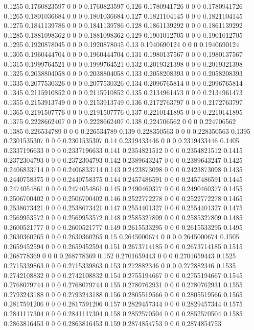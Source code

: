 {0.1255 0.1760823597 0 0 0 0.1760823597
0.126 0.1780941726 0 0 0 0.1780941726
0.1265 0.1801036684 0 0 0 0.1801036684
0.127 0.1821104145 0 0 0 0.1821104145
0.1275 0.1841139786 0 0 0 0.1841139786
0.128 0.1861139292 0 0 0 0.1861139292
0.1285 0.1881098362 0 0 0 0.1881098362
0.129 0.1901012705 0 0 0 0.1901012705
0.1295 0.1920878045 0 0 0 0.1920878045
0.13 0.1940690124 0 0 0 0.1940690124
0.1305 0.1960444704 0 0 0 0.1960444704
0.131 0.1980137567 0 0 0 0.1980137567
0.1315 0.1999764521 0 0 0 0.1999764521
0.132 0.2019321398 0 0 0 0.2019321398
0.1325 0.2038804058 0 0 0 0.2038804058
0.133 0.2058208393 0 0 0 0.2058208393
0.1335 0.2077530326 0 0 0 0.2077530326
0.134 0.2096765814 0 0 0 0.2096765814
0.1345 0.2115910852 0 0 0 0.2115910852
0.135 0.2134961473 0 0 0 0.2134961473
0.1355 0.2153913749 0 0 0 0.2153913749
0.136 0.2172763797 0 0 0 0.2172763797
0.1365 0.2191507776 0 0 0 0.2191507776
0.137 0.2210141895 0 0 0 0.2210141895
0.1375 0.2228662407 0 0 0 0.2228662407
0.138 0.224706562 0 0 0 0.224706562
0.1385 0.226534789 0 0 0 0.226534789
0.139 0.228350563 0 0 0 0.228350563
0.1395 0.2301535307 0 0 0 0.2301535307
0.14 0.2319433446 0 0 0 0.2319433446
0.1405 0.2337196633 0 0 0 0.2337196633
0.141 0.2354821512 0 0 0 0.2354821512
0.1415 0.2372304793 0 0 0 0.2372304793
0.142 0.2389643247 0 0 0 0.2389643247
0.1425 0.2406833714 0 0 0 0.2406833714
0.143 0.2423873098 0 0 0 0.2423873098
0.1435 0.2440758375 0 0 0 0.2440758375
0.144 0.2457486591 0 0 0 0.2457486591
0.1445 0.2474054861 0 0 0 0.2474054861
0.145 0.2490460377 0 0 0 0.2490460377
0.1455 0.2506700402 0 0 0 0.2506700402
0.146 0.2522772278 0 0 0 0.2522772278
0.1465 0.2538673421 0 0 0 0.2538673421
0.147 0.2554401327 0 0 0 0.2554401327
0.1475 0.2569953572 0 0 0 0.2569953572
0.148 0.2585327809 0 0 0 0.2585327809
0.1485 0.2600521777 0 0 0 0.2600521777
0.149 0.2615533295 0 0 0 0.2615533295
0.1495 0.2630360265 0 0 0 0.2630360265
0.15 0.2645000674 0 0 0 0.2645000674
0.1505 0.2659452594 0 0 0 0.2659452594
0.151 0.2673714185 0 0 0 0.2673714185
0.1515 0.268778369 0 0 0 0.268778369
0.152 0.2701659443 0 0 0 0.2701659443
0.1525 0.2715339863 0 0 0 0.2715339863
0.153 0.272882346 0 0 0 0.272882346
0.1535 0.2742108832 0 0 0 0.2742108832
0.154 0.2755194667 0 0 0 0.2755194667
0.1545 0.2768079744 0 0 0 0.2768079744
0.155 0.2780762931 0 0 0 0.2780762931
0.1555 0.2793243188 0 0 0 0.2793243188
0.156 0.2805519566 0 0 0 0.2805519566
0.1565 0.2817591206 0 0 0 0.2817591206
0.157 0.2829457344 0 0 0 0.2829457344
0.1575 0.2841117304 0 0 0 0.2841117304
0.158 0.2852570504 0 0 0 0.2852570504
0.1585 0.2863816453 0 0 0 0.2863816453
0.159 0.2874854753 0 0 0 0.2874854753
}
